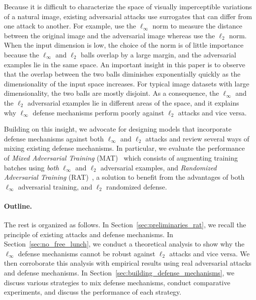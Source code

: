 Because it is difficult to characterize the space of visually imperceptible variations of a natural image, existing adversarial attacks use surrogates that can differ from one attack to another. For example, \cite{goodfellow2014explaining} use the $\ell_\infty$ norm to measure the distance between the original image and the adversarial image whereas \cite{carlini2017towards} use the $\ell_2$ norm.  When the input dimension is low, the choice of the norm is of little importance because the $\ell_\infty$ and $\ell_2$ balls overlap by a large margin, and the adversarial examples lie in the same space. An important insight in this paper is to observe that the overlap between the two balls  diminishes exponentially quickly as the dimensionality of the input space increases. For typical image datasets with large dimensionality, the two balls are mostly disjoint. As a consequence, the $\ell_\infty$ and the $\ell_2$ adversarial examples lie in different areas of the space, and it explains why $\ell_\infty$ defense mechanisms perform poorly against $\ell_2$ attacks and vice versa. 

Building on this insight, we advocate for designing models that incorporate defense mechanisms against both $\ell_\infty$ and $\ell_2$ attacks and review several ways of mixing existing defense mechanisms. In particular, we evaluate the performance of  {\em Mixed Adversarial Training} (MAT)~\cite{goodfellow2014explaining} which consists of  augmenting training batches using \emph{both} $\ell_\infty$ and $\ell_2$ adversarial examples, and {\em Randomized Adversarial Training} (RAT)~\cite{salman2019provably}, a solution to benefit from the advantages of both $\ell_\infty$ adversarial training, and $\ell_2$ randomized defense. 


\paragraph{Outline.} The rest is organized as follows. In Section~\ref{sec:preliminaries_rat}, we recall the principle of existing attacks and defense mechanisms. In Section~\ref{sec:no_free_lunch}, we conduct a theoretical analysis to show why  the $\ell_\infty$ defense mechanisms cannot be robust against $\ell_2$ attacks and vice versa. We then corroborate this analysis with empirical results using real adversarial attacks and defense mechanisms. In Section~\ref{sec:building_defense_mechanisms}, we discuss various strategies to mix defense mechanisms, conduct comparative experiments, and discuss the performance of each strategy. 



